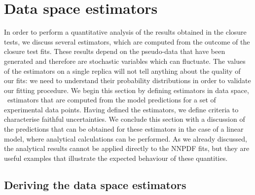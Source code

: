 \section{Data space estimators} 
\label{sec:ClosureEstimators}

In order to perform a quantitative analysis of the results obtained in the
closure tests, we discuss several estimators, which are computed from the
outcome of the closure test fits. These results depend on the pseudo-data that
have been generated and therefore are stochastic variables which can fluctuate.
The values of the estimators on a single replica will not tell anything about
the quality of our fits: we need to understand their probability distributions
in order to validate our fitting procedure. We begin this section by defining
estimators in data space, \ie\ estimators that are computed from the model
predictions for a set of experimental data points. Having defined the
estimators, we define criteria to characterise faithful uncertainties. We
conclude this section with a discussion of the predictions that can be obtained
for these estimators in the case of a linear model, where analytical
calculations can be performed. As we already discussed, the analytical results
cannot be applied directly to the NNPDF fits, but they are useful examples that
illustrate the expected behaviour of these quantities.

\subsection{Deriving the data space estimators}
\label{sec:ClosureEstimatorsDerivation}

